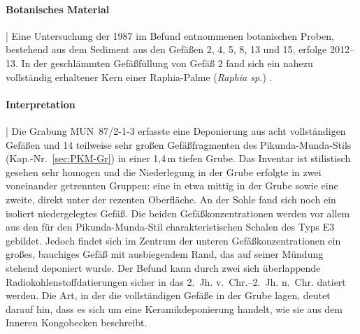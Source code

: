 \paragraph{Botanisches Material}\hspace{-.5em}|\hspace{.5em}%
Eine Untersuchung der 1987 im Befund entnommenen botanischen Proben, bestehend aus dem Sediment aus den Gefäßen 2, 4, 5, 8, 13 und 15, erfolge 2012--13. In der geschlämmten Gefäßfüllung von Gefäß 2 fand sich ein nahezu vollständig erhaltener Kern einer Raphia-Palme (\textit{Raphia sp.}) \parencite[506, 508 Abb. 7]{Kahlheber.2014}. 


\paragraph{Interpretation}\hspace{-.5em}|\hspace{.5em}%
Die Grabung MUN~87/2-1-3 erfasste eine Deponierung aus acht vollständigen Gefäßen und 14 teilweise sehr großen Gefäßfragmenten des Pikunda-Munda-Stils (Kap.-Nr.~\ref{sec:PKM-Gr}) in einer 1,4\,m tiefen Grube. Das Inventar ist stilistisch gesehen sehr homogen und die Niederlegung in der Grube erfolgte in zwei voneinander getrennten Gruppen: eine in etwa mittig in der Grube sowie eine zweite, direkt unter der rezenten Oberfläche. An der Sohle fand sich noch ein isoliert niedergelegtes Gefäß. Die beiden Gefäßkonzentrationen werden vor allem aus den für den Pikunda-Munda-Stil charakteristischen Schalen des Typs E3 gebildet. Jedoch findet sich im Zentrum der unteren Gefäßkonzentrationen ein großes, bauchiges Gefäß mit ausbiegendem Rand, das auf seiner Mündung stehend deponiert wurde. Der Befund kann durch zwei sich überlappende Radiokohlenstoffdatierungen sicher in das 2.~Jh. v.~Chr.--2.~Jh. n.~Chr. datiert werden. Die Art, in der die vollständigen Gefäße in der Grube lagen, deutet darauf hin, dass es sich um eine Keramikdeponierung handelt, wie sie \textcites{Wotzka.1993}{Wotzka.1995} aus dem Inneren Kongobecken beschreibt.